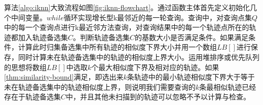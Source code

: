 

算法\ref{algo:iknn}{\cite{chen2010searching}}大致流程如图\ref{fig:iknn-flowchart}。通过函数主体首先定义初始化几个中间变量。$while$循环实现增长型k最邻近的每一轮查询。查询中，对查询点集$Q$中的每一个查询点进行k最近邻方法查询，对查询结果中的每一个轨迹点所在的轨迹都加入轨迹备选集$C$。判断轨迹备选集$C$的基数大小是否满足条件。如果满足条件，计算此时归集备选集中所有轨迹的相似度下界大小并用一个数组$LB[]$进行保存，同时计算未在轨迹备选集中的轨迹的相似度上界大小。运用堆排序或优先队列的思想将数组$LB[]$中选取$k$个最大相似度下界及相对应的轨迹。如果\ref{thm:similarity-bound}满足，即选出来$k$条轨迹中的最小轨迹相似度下界大于等于未在轨迹备选集中的轨迹相似度上界，则说明我们需要查询的$k$条最相似轨迹已经存在于轨迹备选集$C$中，并且其他未扫描到的轨迹可以忽略不予以计算与检查。


\begin{figure}[!htp]
    \centering
    \resizebox{10cm}{!}{}
\end{figure}


